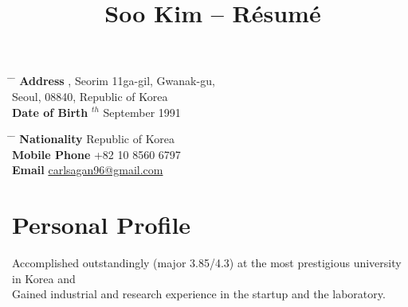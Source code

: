\documentclass[10pt]{article} %
\begin{document}

\title{Soo Kim -- Résumé} %


\parbox[c][3em][c]{0.5\textwidth}{ %
\begin{tabbing} %
\hspace{3cm} \= \hspace{4cm} \= \kill %
\textbf{Address} , Seorim 11ga-gil, Gwanak-gu,\\ %
\> Seoul, 08840, Republic of Korea\\ %
\textbf{Date of Birth} $^{th}$ September 1991\\ %
\end{tabbing}
}
\hfill %
\parbox[c][3em][c]{0.5\textwidth}{ %
\begin{tabbing} %
\hspace{3cm} \= \hspace{4cm} \= \kill %
\textbf{Nationality} \> Republic of Korea\\ %
\textbf{Mobile Phone} \> +82 10 8560 6797\\ %
\textbf{Email} \> \href{mailto:carlsagan96@gmail.com}{carlsagan96@gmail.com}\\ %
\end{tabbing}}


\section{Personal Profile}

Accomplished outstandingly (major 3.85/4.3) at the most prestigious university in Korea and\\
Gained industrial and research experience in the startup and the laboratory.
\end{document}
